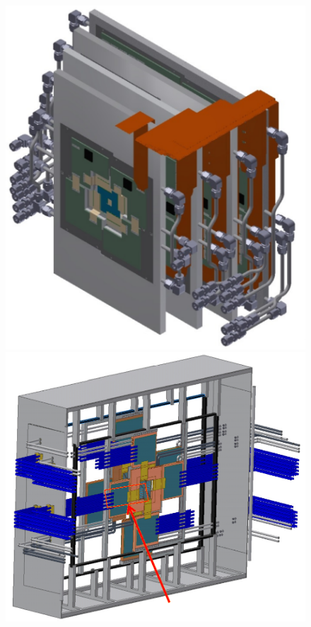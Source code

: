 \begin{figure}[H]
\begin{minipage}[b]{0.495\textwidth}
\includegraphics[width=1.0\textwidth]{pictures/MVD_1.png}
\end{minipage}
\hspace{0.01\textwidth}
\begin{minipage}[b]{0.495\textwidth}
\includegraphics[width=1.0\textwidth]{pictures/MVD_2.png}
\end{minipage}
\caption{}
\label{fig:MVD12}
\end{figure}

